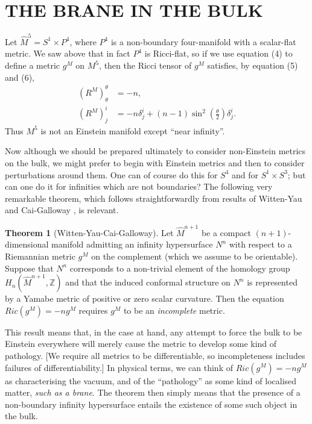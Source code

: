 \documentclass[a4paper,12pt]{article}
\newcommand{\field}[1]{\mathbb{#1}}
\newcommand{\Z}{\field{Z}}
\theoremstyle{definition}
\newtheorem{thm}{Theorem}
\renewcommand{\u}{\textit}
\renewcommand{\-}{$\dfrac{\quad\enspace}{\quad}$}
\begin{document}
\section{\large THE BRANE IN THE BULK}

Let $\hat{M}^5=S^1\times P^4$, where $P^4$ is a non-boundary four-manifold with a scalar-flat metric. We saw above that in fact $P^4$ is Ricci-flat, so if we use equation (4) to define a metric $g^M$ on $M^5$, then the Ricci tensor of $g^M$ satisfies, by equation (5) and (6),
\begin{align}
(R^M)^\theta_\theta&=-n,\\
(R^M)^i_j&=-n\delta^i_j+(n-1)\sin^2(\frac{\theta}{2})\delta^i_j.
\end{align}
Thus $M^5$ is not an Einstein manifold except ``near infinity''.

Now although we should be prepared ultimately to consider non-Einstein metrics on the bulk, we might prefer to begin with Einstein metrics and then to consider perturbations around them. One can of course do this for $S^4$ and for $S^1\times S^3$; but can one do it for infinities which are not boundaries? The following very remarkable theorem, which follows straightforwardly from results of Witten-Yau \cite{4} and Cai-Galloway \cite{5}, is relevant.
\begin{thm}[Witten-Yau-Cai-Galloway]
Let $\hat{M}^{n+1}$ be a compact $(n+1)$-dimensional manifold admitting an infinity hypersurface $N^n$ with respect to a Riemannian metric $g^M$ on the complement (which we assume to be orientable). Suppose that $N^n$ corresponds to a non-trivial element of the homology group $H_n(\hat{M}^{n+1},\Z)$ and that the induced conformal structure on $N^n$ is represented by a Yamabe metric of positive or zero scalar curvature. Then the equation $Ric(g^M)=-ng^M$ requires $g^M$ to be an \u{incomplete} metric.
\end{thm}

This result means that, in the case at hand, any attempt to force the bulk to be Einstein everywhere will merely cause the metric to develop some kind of pathology. [We require
all metrics to be differentiable, so incompleteness includes failures of differentiability.]
In physical terms, we can think of $Ric(g^M)=-ng^M$ as characterising the vacuum, and of the ``pathology'' as some kind of localised matter, \u{such as a brane}. The theorem then simply means that the presence of a non-boundary infinity hypersurface entails the existence of some such object in the bulk.
\end{document}
